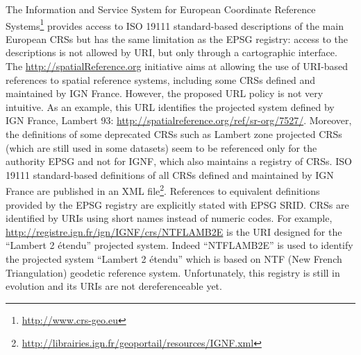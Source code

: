 \begin{table}[!htp]
\end{table}

The Information and Service System for European Coordinate Reference Systems\footnote{\url{http://www.crs-geo.eu}}  provides access to ISO 19111 standard-based descriptions of the main European CRSs but has the same limitation as the EPSG registry: access to the descriptions is not allowed by URI, but only through a cartographic interface.
The \url{http://spatialReference.org} initiative aims at allowing the use of URI-based references to spatial reference systems, including some CRSs defined and maintained by IGN France.  However, the proposed URL policy is not very intuitive. As an example, this URL identifies the projected system defined by IGN France, Lambert 93: \url{http://spatialreference.org/ref/sr-org/7527/}. Moreover, the definitions of some deprecated CRSs such as Lambert zone projected CRSs (which are still used in some datasets) seem to be referenced only for the authority EPSG and not for IGNF, which also maintains a registry of CRSs. ISO 19111 standard-based definitions of all CRSs defined and maintained by IGN France are  published in an XML file\footnote{\url{ http://librairies.ign.fr/geoportail/resources/IGNF.xml}}.
References to equivalent definitions provided by the EPSG registry are explicitly stated with EPSG SRID. CRSs are identified by URIs using short names instead of numeric codes. For example, \url{http://registre.ign.fr/ign/IGNF/crs/NTFLAMB2E}  is the URI designed for the ``Lambert 2 \'{e}tendu'' projected system. Indeed ``NTFLAMB2E'' is used to identify the projected system ``Lambert 2 \'{e}tendu'' which is based on NTF (New French Triangulation) geodetic reference system. Unfortunately, this registry is still in evolution and its URIs are not dereferenceable yet.

